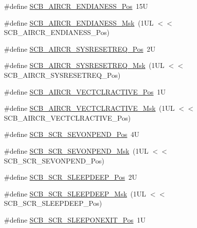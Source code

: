 \begin{DoxyCompactItemize}
\item 
\#define \hyperlink{group___c_m_s_i_s___s_c_b_gad31dec98fbc0d33ace63cb1f1a927923}{S\-C\-B\-\_\-\-A\-I\-R\-C\-R\-\_\-\-E\-N\-D\-I\-A\-N\-E\-S\-S\-\_\-\-Pos}~15\-U
\item 
\#define \hyperlink{group___c_m_s_i_s___s_c_b_ga2f571f93d3d4a6eac9a3040756d3d951}{S\-C\-B\-\_\-\-A\-I\-R\-C\-R\-\_\-\-E\-N\-D\-I\-A\-N\-E\-S\-S\-\_\-\-Msk}~(1\-U\-L $<$$<$ S\-C\-B\-\_\-\-A\-I\-R\-C\-R\-\_\-\-E\-N\-D\-I\-A\-N\-E\-S\-S\-\_\-\-Pos)
\item 
\#define \hyperlink{group___c_m_s_i_s___s_c_b_gaffb2737eca1eac0fc1c282a76a40953c}{S\-C\-B\-\_\-\-A\-I\-R\-C\-R\-\_\-\-S\-Y\-S\-R\-E\-S\-E\-T\-R\-E\-Q\-\_\-\-Pos}~2\-U
\item 
\#define \hyperlink{group___c_m_s_i_s___s_c_b_gaae1181119559a5bd36e62afa373fa720}{S\-C\-B\-\_\-\-A\-I\-R\-C\-R\-\_\-\-S\-Y\-S\-R\-E\-S\-E\-T\-R\-E\-Q\-\_\-\-Msk}~(1\-U\-L $<$$<$ S\-C\-B\-\_\-\-A\-I\-R\-C\-R\-\_\-\-S\-Y\-S\-R\-E\-S\-E\-T\-R\-E\-Q\-\_\-\-Pos)
\item 
\#define \hyperlink{group___c_m_s_i_s___s_c_b_gaa30a12e892bb696e61626d71359a9029}{S\-C\-B\-\_\-\-A\-I\-R\-C\-R\-\_\-\-V\-E\-C\-T\-C\-L\-R\-A\-C\-T\-I\-V\-E\-\_\-\-Pos}~1\-U
\item 
\#define \hyperlink{group___c_m_s_i_s___s_c_b_ga212c5ab1c1c82c807d30d2307aa8d218}{S\-C\-B\-\_\-\-A\-I\-R\-C\-R\-\_\-\-V\-E\-C\-T\-C\-L\-R\-A\-C\-T\-I\-V\-E\-\_\-\-Msk}~(1\-U\-L $<$$<$ S\-C\-B\-\_\-\-A\-I\-R\-C\-R\-\_\-\-V\-E\-C\-T\-C\-L\-R\-A\-C\-T\-I\-V\-E\-\_\-\-Pos)
\item 
\#define \hyperlink{group___c_m_s_i_s___s_c_b_ga3bddcec40aeaf3d3a998446100fa0e44}{S\-C\-B\-\_\-\-S\-C\-R\-\_\-\-S\-E\-V\-O\-N\-P\-E\-N\-D\-\_\-\-Pos}~4\-U
\item 
\#define \hyperlink{group___c_m_s_i_s___s_c_b_gafb98656644a14342e467505f69a997c9}{S\-C\-B\-\_\-\-S\-C\-R\-\_\-\-S\-E\-V\-O\-N\-P\-E\-N\-D\-\_\-\-Msk}~(1\-U\-L $<$$<$ S\-C\-B\-\_\-\-S\-C\-R\-\_\-\-S\-E\-V\-O\-N\-P\-E\-N\-D\-\_\-\-Pos)
\item 
\#define \hyperlink{group___c_m_s_i_s___s_c_b_gab304f6258ec03bd9a6e7a360515c3cfe}{S\-C\-B\-\_\-\-S\-C\-R\-\_\-\-S\-L\-E\-E\-P\-D\-E\-E\-P\-\_\-\-Pos}~2\-U
\item 
\#define \hyperlink{group___c_m_s_i_s___s_c_b_ga77c06a69c63f4b3f6ec1032e911e18e7}{S\-C\-B\-\_\-\-S\-C\-R\-\_\-\-S\-L\-E\-E\-P\-D\-E\-E\-P\-\_\-\-Msk}~(1\-U\-L $<$$<$ S\-C\-B\-\_\-\-S\-C\-R\-\_\-\-S\-L\-E\-E\-P\-D\-E\-E\-P\-\_\-\-Pos)
\item 
\#define \hyperlink{group___c_m_s_i_s___s_c_b_ga3680a15114d7fdc1e25043b881308fe9}{S\-C\-B\-\_\-\-S\-C\-R\-\_\-\-S\-L\-E\-E\-P\-O\-N\-E\-X\-I\-T\-\_\-\-Pos}~1\-U
$$
\end{DoxyCompactItemize}
